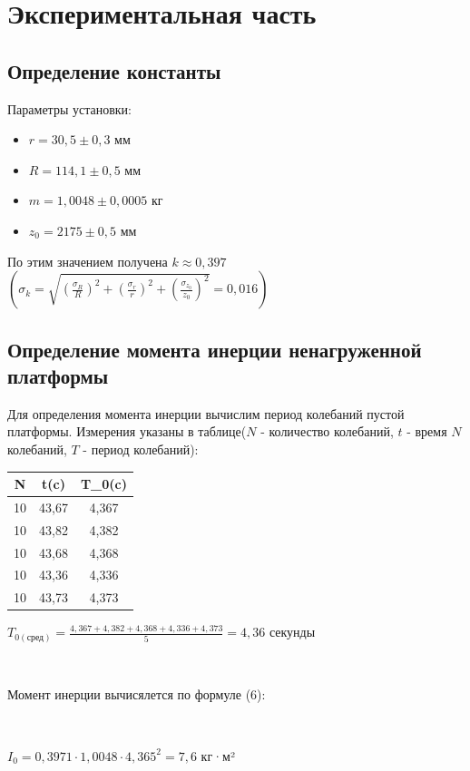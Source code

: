 \documentclass{article}
\begin{document}
\section*{Экспериментальная часть}
\subsection*{Определение константы}
Параметры установки:
\begin{itemize}
    \item $r = 30,5 \pm 0,3$ мм
    \item $R = 114,1 \pm 0,5$ мм
    \item $m= 1,0048 \pm 0,0005$ кг
    \item $z_0 = 2175 \pm 0,5$ мм
\end{itemize}

\noindent
По этим значением получена $k \approx 0,397$ $(\sigma_k = \sqrt{(\frac{\sigma_R}{R})^2 + (\frac{\sigma_r}{r})^2 + (\frac{\sigma_{z_0}}{z_0})^2} = 0,016)$

\subsection*{Определение момента инерции ненагруженной платформы}
Для определения момента инерции вычислим период колебаний пустой платформы. Измерения указаны в таблице($N$ - количество колебаний, $t$ - время $N$ колебаний, $T$ - период колебаний):
\begin{table}[h]
    \centering
    \begin{tabular}{|c|c|c|}
    \hline
        N  & t(c) & T_0(c) \\
    \hline
        10 & 43,67 & 4,367 \\
        10 & 43,82 & 4,382 \\
        10 & 43,68 & 4,368 \\
        10 & 43,36 & 4,336 \\
        10 & 43,73 & 4,373 \\
    \hline
    \end{tabular}
    \label{tab:my_label}
\end{table}

$T_{0(\text{сред})} = \frac{4,367 + 4,382 + 4,368 + 4,336 + 4,373}{5} = 4,36$ секунды

\

\noindent
Момент инерции вычисялется по формуле (6):

\

$I_0 = 0,3971 \cdot 1,0048  \cdot 4,365^2 = 7,6$ кг·м²
\end{document}
